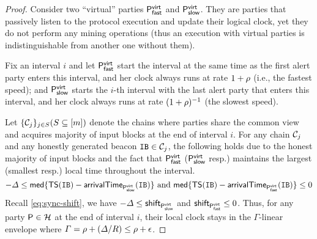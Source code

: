 \begin{proof}
    Consider two ``virtual'' parties $\mathsf{P}^{\mathsf{virt}}_{\mathsf{fast}}$ and  $\mathsf{P}^{\mathsf{virt}}_{\mathsf{slow}}$.
    They are parties that passively listen to the protocol execution and update their logical clock, yet they do not perform any mining operations (thus an execution with virtual parties is indistinguishable from another one without them).

    Fix an interval $i$ and let $\mathsf{P}^{\mathsf{virt}}_{\mathsf{fast}}$ start the interval at the same time as the first alert party enters this interval, and her clock always runs at rate $1 + \rho$ (i.e., the fastest speed); and $\mathsf{P}^{\mathsf{virt}}_{\mathsf{slow}}$ starts the $i$-th interval with the last alert party that enters this interval, and her clock always runs at rate $(1 + \rho)^{-1}$ (the slowest speed).

    Let $\{ \mathcal{C}_j \}_{j \in S} (S \subseteq [m])$ denote the chains where parties share the common view and acquires majority of input blocks at the end of interval $i$.
    For any chain $\mathcal{C}_j$ and any honestly generated beacon $\mathtt{IB} \in \mathcal{C}_j$, the following holds due to the honest majority of input blocks and the fact that $\mathsf{P}^{\mathsf{virt}}_{\mathsf{fast}}$ ($\mathsf{P}^{\mathsf{virt}}_{\mathsf{slow}}$ resp.) maintains the largest (smallest resp.) local time throughout the interval.
    \begin{equation*}
        - \varDelta \le \mathsf{med}\{ \mathsf{TS}(\mathtt{IB}) - \mathsf{arrivalTime}_{\mathsf{P}^{\mathsf{virt}}_{\mathsf{slow}}}(\mathtt{IB}) \}
        ~\mathrm{and}~
        \mathsf{med}\{ \mathsf{TS}(\mathtt{IB}) - \mathsf{arrivalTime}_{\mathsf{P}^{\mathsf{virt}}_{\mathsf{fast}}}(\mathtt{IB}) \} \le 0
    \end{equation*}
    Recall \cref{eq:sync-shift}, we have $ - \varDelta \le \mathsf{shift}_{\mathsf{P}^{\mathsf{virt}}_{\mathsf{slow}}}$ and $\mathsf{shift}_{\mathsf{P}^{\mathsf{virt}}_{\mathsf{fast}}} \le 0$.
    Thus, for any party $\mathsf{P} \in \mathcal{H}$ at the end of interval $i$, their local clock stays in the $\varGamma$-linear envelope where $\varGamma = \rho + (\varDelta / R) \le \rho + \epsilon$.
\end{proof}